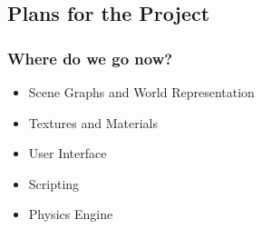 \documentclass{beamer}
\begin{document}
\subsection{Plans for the Project}

\begin{frame}
   \frametitle{Where do we go now?}
   \begin{itemize}
      \item Scene Graphs and World Representation
      \item Textures and Materials
      \item User Interface
      \item Scripting
      \item Physics Engine
   \end{itemize}
\end{frame}
\end{document}
